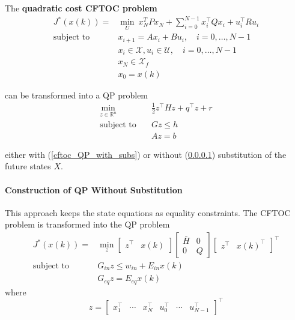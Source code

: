 \newpar{}

The \textbf{quadratic cost CFTOC problem}
\begin{align*}
    J^*(x(k)) =            & \min_U \: x_N^T P x_N + \sum_{i=0}^{N-1}x_i^\top Q x_i + u_i^\top R u_i \\
    \text{subject to}\quad & x_{i+1} = Ax_i +Bu_i, \quad i = 0, \ldots, N-1                          \\
                           & x_i \in \mathcal{X}, u_i \in \mathcal{U}, \quad i = 0, \ldots, N-1      \\
                           & x_N \in \mathcal{X}_f                                                   \\
                           & x_0 = x(k)
\end{align*}

can be transformed into a QP problem
\begin{align*}
    \min_{z\in\mathbb{R}^n} & \frac{1}{2}z^\top Hz + q^\top z + r \\
    \text{subject to}\quad  & Gz \leq h                           \\
                            & Az = b
\end{align*}

either with (\ref{cftoc_QP_with_subs}) or without (\ref{cftoc_QP_without_subs}) substitution of the future states $X$.

\paragraph{Construction of QP Without Substitution}\label{cftoc_QP_without_subs}

This approach keeps the state equations as equality constraints. The CFTOC problem is transformed into the QP problem
\begin{align*}
    J^*(x(k)) =            & \min_{z}\begin{bmatrix}
                                         z^\top & x(k)
                                     \end{bmatrix}
    \begin{bmatrix}
        \bar{H} & 0 \\
        0       & Q
    \end{bmatrix}
    \begin{bmatrix}
        z^\top & {x(k)}^\top
    \end{bmatrix}^\top                                       \\
    \text{subject to}\quad & G_{in} z \leq w_{in} +E_{in} x(k) \\
                           & G_{eq} z = E_{eq} x(k)
\end{align*}
where
\begin{equation*}
    z = \begin{bmatrix}
        x_1^\top & \cdots & x_N^\top & u_0^\top & \cdots & u_{N-1}^\top
    \end{bmatrix}^\top
\end{equation*}

